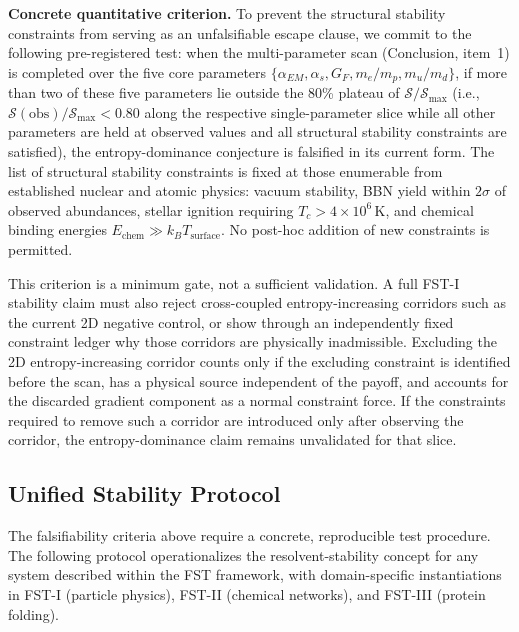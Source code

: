 \documentclass[12pt,a4paper]{article}
\theoremstyle{remark}
\begin{document}
\textbf{Concrete quantitative criterion.} To prevent the structural stability constraints from serving as an unfalsifiable escape clause, we commit to the following pre-registered test: when the multi-parameter scan (Conclusion, item~1) is completed over the five core parameters $\{\alpha_{EM}, \alpha_s, G_F, m_e/m_p, m_u/m_d\}$, if more than two of these five parameters lie outside the 80\% plateau of $\mathcal{S}/\mathcal{S}_{\max}$ (i.e., $\mathcal{S}(\text{obs})/\mathcal{S}_{\max} < 0.80$ along the respective single-parameter slice while all other parameters are held at observed values and all structural stability constraints are satisfied), the entropy-dominance conjecture is falsified in its current form. The list of structural stability constraints is fixed at those enumerable from established nuclear and atomic physics: vacuum stability, BBN yield within $2\sigma$ of observed abundances, stellar ignition requiring $T_c > 4 \times 10^6\,$K, and chemical binding energies $E_{\text{chem}} \gg k_B T_{\text{surface}}$. No post-hoc addition of new constraints is permitted.

This criterion is a minimum gate, not a sufficient validation. A full FST-I stability claim must also reject cross-coupled entropy-increasing corridors such as the current 2D negative control, or show through an independently fixed constraint ledger why those corridors are physically inadmissible. Excluding the 2D entropy-increasing corridor counts only if the excluding constraint is identified before the scan, has a physical source independent of the payoff, and accounts for the discarded gradient component as a normal constraint force. If the constraints required to remove such a corridor are introduced only after observing the corridor, the entropy-dominance claim remains unvalidated for that slice.

\subsection{Unified Stability Protocol}\label{sec:stability-protocol}

The falsifiability criteria above require a concrete, reproducible test procedure.
The following protocol operationalizes the resolvent-stability concept for
any system described within the FST framework, with domain-specific
instantiations in FST-I (particle physics), FST-II (chemical networks),
and FST-III (protein folding).
\end{document}
